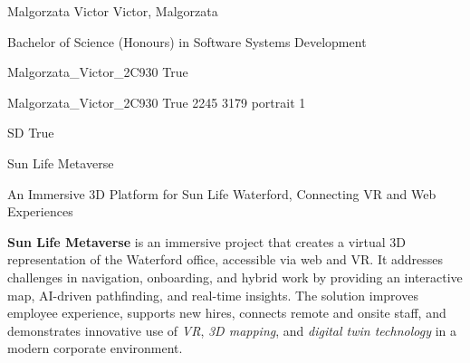\documentclass[twoside]{report}
\begin{document}
\begingroup{}\relax



\def\Key{Malgorzata_Victor_2C930}

{Malgorzata Victor}
{Victor, Malgorzata}

{Bachelor of Science (Honours) in Software Systems Development}

{Malgorzata_Victor_2C930}
{True}

{Malgorzata_Victor_2C930}
{True}
{2245}
{3179}
{portrait}
{1}

{SD}
{True}

{Sun Life Metaverse}

{An Immersive 3D Platform for Sun Life Waterford, Connecting VR and Web Experiences}

{{\bfseries Sun Life Metaverse} is an immersive project that creates a virtual 3D representation of the Waterford office, accessible via web and VR. It addresses challenges in navigation, onboarding, and hybrid work by providing an interactive map, AI-driven pathfinding, and real-time insights. The solution improves employee experience, supports new hires, connects remote and onsite staff, and demonstrates innovative use of \emph{VR}, \emph{3D mapping}, and \emph{digital twin technology} in a modern corporate environment.}
\end{document}

